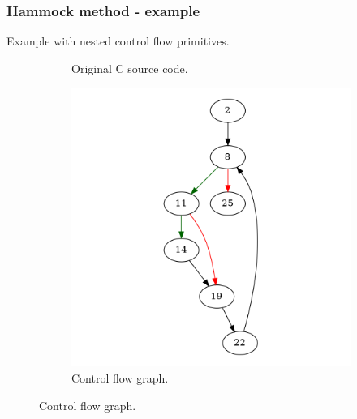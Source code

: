 \documentclass[aspectratio=1610]{beamer}
\begin{document}
\begin{frame}
	\frametitle{Hammock method - example}
	Example with nested control flow primitives.
	\begin{figure}[htbp]
		\centering
		\begin{subfigure}[b]{0.30\textwidth}
			\centering
			
			\caption{Original C source code.}
		\end{subfigure}
		\begin{subfigure}[b]{0.50\textwidth}
			\centering
			\includegraphics[height=0.6\paperheight]{inc/methods/hammock/example/without-break/main.png}
			\caption{Control flow graph.}
		\end{subfigure}
	\end{figure}
\end{frame}
\end{document}
